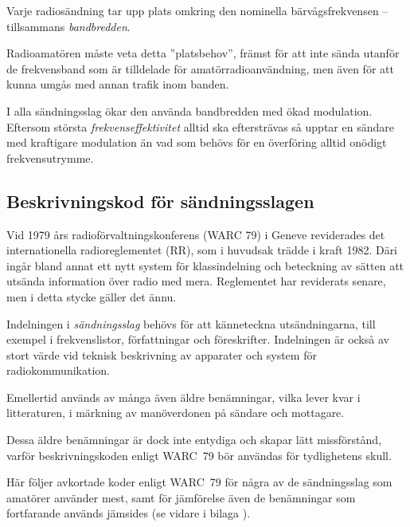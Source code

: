 Varje radiosändning tar upp plats omkring den nominella bärvågsfrekvensen --
tillsammans \emph{bandbredden}.

Radioamatören måste veta detta ''platsbehov'', främst för att inte sända utanför
de frekvensband som är tilldelade för amatörradioanvändning, men även för att
kunna umgås med annan trafik inom banden.

I alla sändningsslag ökar den använda bandbredden med ökad modulation.
Eftersom största \emph{frekvenseffektivitet} alltid ska eftersträvas så upptar
en sändare med kraftigare modulation än vad som behövs för en överföring alltid
onödigt frekvensutrymme.

\subsection{Beskrivningskod för sändningsslagen}
\label{modulation_beskrivningskod}

Vid 1979 års radioförvaltningskonferens (WARC 79) i Geneve reviderades det
internationella radioreglementet (RR), som i huvudsak trädde i kraft 1982.
Däri ingår bland annat ett nytt system för klassindelning och beteckning av
sätten att utsända information över radio med mera.
Reglementet har reviderats senare, men i detta stycke gäller det ännu.

Indelningen i \emph{sändningsslag} behövs för att känneteckna utsändningarna,
till exempel i frekvenslistor, författningar och föreskrifter.
Indelningen är också av stort värde vid teknisk beskrivning av apparater och
system för radiokommunikation.

Emellertid används av många även äldre benämningar, vilka lever kvar i
litteraturen, i märkning av manöverdonen på sändare och mottagare.

Dessa äldre benämningar är dock inte entydiga och skapar lätt missförstånd,
varför beskrivningskoden enligt WARC~79 bör användas för tydlighetens skull.

Här följer avkortade koder enligt WARC~79 för några av de sändningsslag som
amatörer använder mest, samt för jämförelse även de benämningar som fortfarande
används jämsides (se vidare i bilaga ).


